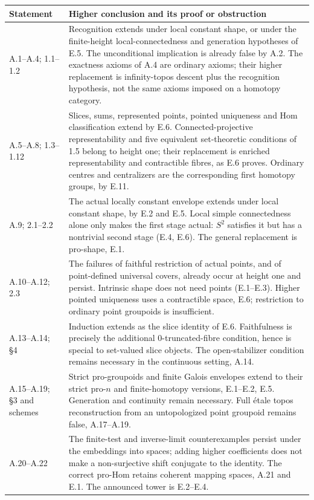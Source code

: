 \begingroup
\small
\begin{longtable}{p{}p{}}
\hline
Statement & Higher conclusion and its proof or obstruction\\
\hline
A.1--A.4; 1.1--1.2 & Recognition extends under local constant shape, or under the finite-height local-connectedness and generation hypotheses of E.5. The unconditional implication is already false by A.2. The exactness axioms of A.4 are ordinary axioms; their higher replacement is infinity-topos descent plus the recognition hypothesis, not the same axioms imposed on a homotopy category.\\[2pt]
A.5--A.8; 1.3--1.12 & Slices, sums, represented points, pointed uniqueness and Hom classification extend by E.6. Connected-projective representability and five equivalent set-theoretic conditions of 1.5 belong to height one; their replacement is enriched representability and contractible fibres, as E.6 proves. Ordinary centres and centralizers are the corresponding first homotopy groups, by E.11.\\[2pt]
A.9; 2.1--2.2 & The actual locally constant envelope extends under local constant shape, by E.2 and E.5. Local simple connectedness alone only makes the first stage actual: $S^2$ satisfies it but has a nontrivial second stage (E.4, E.6). The general replacement is pro-shape, E.1.\\[2pt]
A.10--A.12; 2.3 & The failures of faithful restriction of actual points, and of point-defined universal covers, already occur at height one and persist. Intrinsic shape does not need points (E.1--E.3). Higher pointed uniqueness uses a contractible space, E.6; restriction to ordinary point groupoids is insufficient.\\[2pt]
A.13--A.14; \S4 & Induction extends as the slice identity of E.6. Faithfulness is precisely the additional $0$-truncated-fibre condition, hence is special to set-valued slice objects. The open-stabilizer condition remains necessary in the continuous setting, A.14.\\[2pt]
A.15--A.19; \S3 and schemes & Strict pro-groupoids and finite Galois envelopes extend to their strict pro-$n$ and finite-homotopy versions, E.1--E.2, E.5. Generation and continuity remain necessary. Full étale topos reconstruction from an untopologized point groupoid remains false, A.17--A.19.\\[2pt]
A.20--A.22 & The finite-test and inverse-limit counterexamples persist under the embeddings into spaces; adding higher coefficients does not make a non-surjective shift conjugate to the identity. The correct pro-Hom retains coherent mapping spaces, A.21 and E.1. The announced tower is E.2--E.4.\\[2pt]

\end{longtable}

